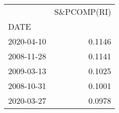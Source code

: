 \begin{tabular}{lr}
\toprule
{} &  S\&PCOMP(RI) \\
DATE       &              \\
\midrule
2020-04-10 &       0.1146 \\
2008-11-28 &       0.1141 \\
2009-03-13 &       0.1025 \\
2008-10-31 &       0.1001 \\
2020-03-27 &       0.0978 \\
\bottomrule
\end{tabular}
